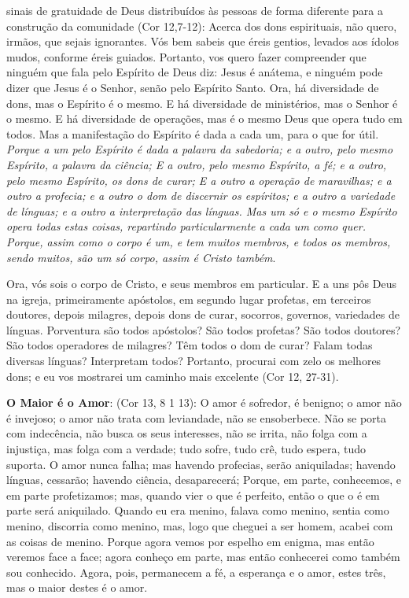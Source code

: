 \documentclass[
]{book}
\begin{document}
sinais de gratuidade de Deus distribuídos às pessoas de forma diferente para a construção da comunidade (Cor 12,7-12): Acerca dos dons espirituais, não quero, irmãos, que sejais ignorantes. Vós bem sabeis que éreis gentios, levados aos ídolos mudos, conforme éreis guiados. Portanto, vos quero fazer compreender que ninguém que fala pelo Espírito de Deus diz: Jesus é anátema, e ninguém pode dizer que Jesus é o Senhor, senão pelo Espírito Santo. Ora, há diversidade de dons, mas o Espírito é o mesmo. E há diversidade de ministérios, mas o Senhor é o mesmo. E há diversidade de operações, mas é o mesmo Deus que opera tudo em todos. Mas a manifestação do Espírito é dada a cada um, para o que for útil. \emph{Porque a um pelo Espírito é dada a palavra da sabedoria; e a outro, pelo mesmo Espírito, a palavra da ciência; E a outro, pelo mesmo Espírito, a fé; e a outro, pelo mesmo Espírito, os dons de curar; E a outro a operação de maravilhas; e a outro a profecia; e a outro o dom de discernir os espíritos; e a outro a variedade de línguas; e a outro a interpretação das línguas. Mas um só e o mesmo Espírito opera todas estas coisas, repartindo particularmente a cada um como quer. Porque, assim como o corpo é um, e tem muitos membros, e todos os membros, sendo muitos, são um só corpo, assim é Cristo também}.

Ora, vós sois o corpo de Cristo, e seus membros em particular. E a uns pôs Deus na igreja, primeiramente apóstolos, em segundo lugar profetas, em terceiros doutores, depois milagres, depois dons de curar, socorros, governos, variedades de línguas. Porventura são todos apóstolos? São todos profetas? São todos doutores? São todos operadores de milagres? Têm todos o dom de curar? Falam todas diversas línguas? Interpretam todos? Portanto, procurai com zelo os melhores dons; e eu vos mostrarei um caminho mais excelente (Cor 12, 27-31).

\textbf{O Maior é o Amor}: (Cor 13, 8 1 13): O amor é sofredor, é benigno; o amor não é invejoso; o amor não trata com leviandade, não se ensoberbece. Não se porta com indecência, não busca os seus interesses, não se irrita, não folga com a injustiça, mas folga com a verdade; tudo sofre, tudo crê, tudo espera, tudo suporta. O amor nunca falha; mas havendo profecias, serão aniquiladas; havendo línguas, cessarão; havendo ciência, desaparecerá; Porque, em parte, conhecemos, e em parte profetizamos; mas, quando vier o que é perfeito, então o que o é em parte será aniquilado. Quando eu era menino, falava como menino, sentia como menino, discorria como menino, mas, logo que cheguei a ser homem, acabei com as coisas de menino. Porque agora vemos por espelho em enigma, mas então veremos face a face; agora conheço em parte, mas então conhecerei como também sou conhecido. Agora, pois, permanecem a fé, a esperança e o amor, estes três, mas o maior destes é o amor.
\end{document}
